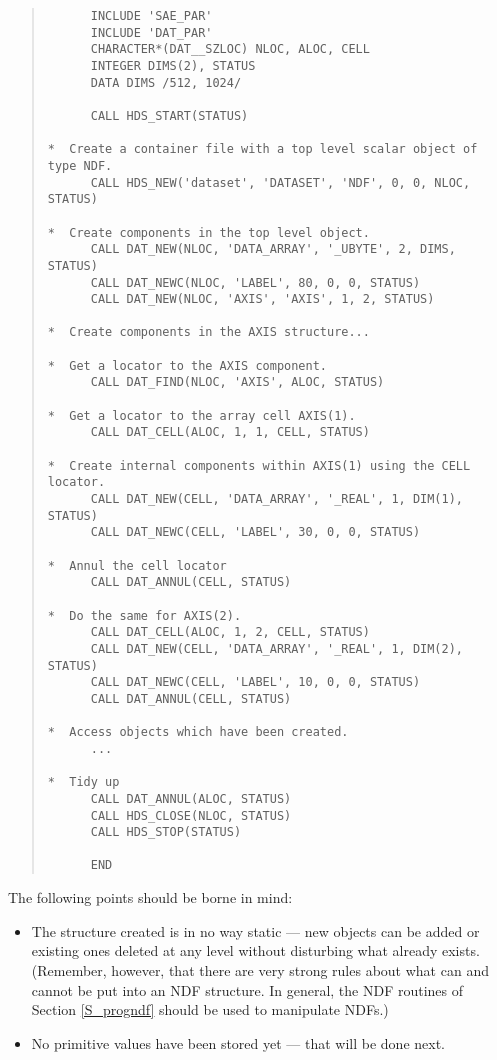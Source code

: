 \begin{quote}

\begin{small}
\begin{verbatim}
      INCLUDE 'SAE_PAR'
      INCLUDE 'DAT_PAR'
      CHARACTER*(DAT__SZLOC) NLOC, ALOC, CELL
      INTEGER DIMS(2), STATUS
      DATA DIMS /512, 1024/

      CALL HDS_START(STATUS)

*  Create a container file with a top level scalar object of type NDF.
      CALL HDS_NEW('dataset', 'DATASET', 'NDF', 0, 0, NLOC, STATUS)

*  Create components in the top level object.
      CALL DAT_NEW(NLOC, 'DATA_ARRAY', '_UBYTE', 2, DIMS, STATUS)
      CALL DAT_NEWC(NLOC, 'LABEL', 80, 0, 0, STATUS)
      CALL DAT_NEW(NLOC, 'AXIS', 'AXIS', 1, 2, STATUS)

*  Create components in the AXIS structure...

*  Get a locator to the AXIS component.
      CALL DAT_FIND(NLOC, 'AXIS', ALOC, STATUS)

*  Get a locator to the array cell AXIS(1).
      CALL DAT_CELL(ALOC, 1, 1, CELL, STATUS)

*  Create internal components within AXIS(1) using the CELL locator.
      CALL DAT_NEW(CELL, 'DATA_ARRAY', '_REAL', 1, DIM(1), STATUS)
      CALL DAT_NEWC(CELL, 'LABEL', 30, 0, 0, STATUS)

*  Annul the cell locator
      CALL DAT_ANNUL(CELL, STATUS)

*  Do the same for AXIS(2).
      CALL DAT_CELL(ALOC, 1, 2, CELL, STATUS)
      CALL DAT_NEW(CELL, 'DATA_ARRAY', '_REAL', 1, DIM(2), STATUS)
      CALL DAT_NEWC(CELL, 'LABEL', 10, 0, 0, STATUS)
      CALL DAT_ANNUL(CELL, STATUS)

*  Access objects which have been created.
      ...

*  Tidy up
      CALL DAT_ANNUL(ALOC, STATUS)
      CALL HDS_CLOSE(NLOC, STATUS)
      CALL HDS_STOP(STATUS)

      END
\end{verbatim}
\end{small}

\end{quote}

The following points should be borne in mind:
\begin{itemize}

\item The structure created is in no way static --- new objects can be added or
existing ones deleted at any level without disturbing what already exists.
(Remember, however, that there are very strong rules about what can and cannot
be put into an NDF structure.
In general, the NDF routines of Section \ref{S_progndf} should be used to
manipulate NDFs.)

\item No primitive values have been stored yet --- that will be done next. 

\end{itemize}

